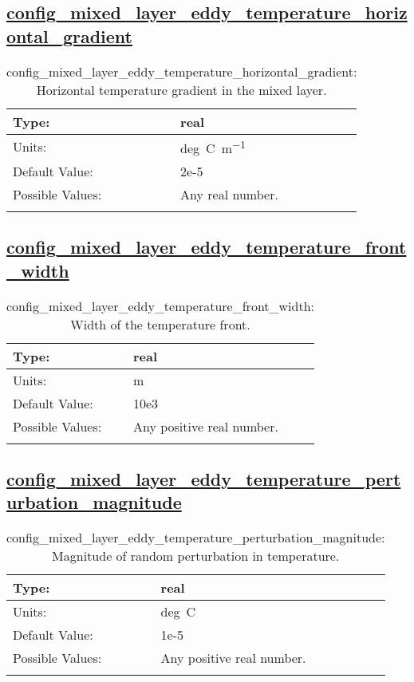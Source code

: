 \subsection[config\_mixed\_layer\_eddy\_temperature\_horizontal\_gradient]{\hyperref[sec:nm_tab_mixed_layer_eddy]{config\_mixed\_layer\_eddy\_temperature\_horizontal\_gradient}}
\label{subsec:nm_sec_config_mixed_layer_eddy_temperature_horizontal_gradient}
\begin{center}
\begin{longtable}{| p{2.0in} || p{4.0in} |}
    \hline
    Type: & real \\
    \hline
    Units: & \si{deg.C.m^{-1}} \\
    \hline
    Default Value: & 2e-5 \\
    \hline
    Possible Values: & Any real number. \\
    \hline
    \caption{config\_mixed\_layer\_eddy\_temperature\_horizontal\_gradient: Horizontal temperature gradient in the mixed layer.}
\end{longtable}
\end{center}
\subsection[config\_mixed\_layer\_eddy\_temperature\_front\_width]{\hyperref[sec:nm_tab_mixed_layer_eddy]{config\_mixed\_layer\_eddy\_temperature\_front\_width}}
\label{subsec:nm_sec_config_mixed_layer_eddy_temperature_front_width}
\begin{center}
\begin{longtable}{| p{2.0in} || p{4.0in} |}
    \hline
    Type: & real \\
    \hline
    Units: & \si{m} \\
    \hline
    Default Value: & 10e3 \\
    \hline
    Possible Values: & Any positive real number. \\
    \hline
    \caption{config\_mixed\_layer\_eddy\_temperature\_front\_width: Width of the temperature front.}
\end{longtable}
\end{center}
\subsection[config\_mixed\_layer\_eddy\_temperature\_perturbation\_magnitude]{\hyperref[sec:nm_tab_mixed_layer_eddy]{config\_mixed\_layer\_eddy\_temperature\_perturbation\_magnitude}}
\label{subsec:nm_sec_config_mixed_layer_eddy_temperature_perturbation_magnitude}
\begin{center}
\begin{longtable}{| p{2.0in} || p{4.0in} |}
    \hline
    Type: & real \\
    \hline
    Units: & \si{deg.C} \\
    \hline
    Default Value: & 1e-5 \\
    \hline
    Possible Values: & Any positive real number. \\
    \hline
    \caption{config\_mixed\_layer\_eddy\_temperature\_perturbation\_magnitude: Magnitude of random perturbation in temperature.}
\end{longtable}
\end{center}
